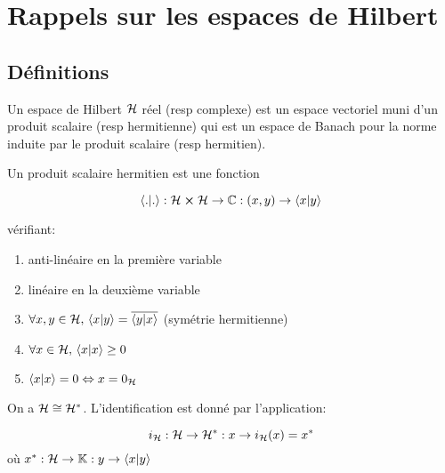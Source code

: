 \section{Rappels sur les espaces de Hilbert}

\subsection{Définitions}

\begin{definition}
	Un espace de Hilbert $\mathcal{H}$ réel (resp complexe) est un espace vectoriel
	muni d'un produit scalaire (resp hermitienne) qui est un espace de Banach
	pour la norme induite par le produit scalaire (resp hermitien).
\end{definition}

\begin{definition}
	Un produit scalaire hermitien est une fonction
	
	\begin{equation}
		\bra{.}\ket{.} : \mathcal{H} \cross
		\mathcal{H} \rightarrow \mathbb{C} :
		(x, y) \rightarrow \bra{x}\ket{y}
	\end{equation}

	vérifiant:

	\begin{enumerate}
		\item anti-linéaire en la première variable
		\item linéaire en la deuxième variable
		\item $\forall x, y \in \mathcal{H}, \, \bra{x}\ket{y} =
			\overline{\bra{y}\ket{x}}$ (symétrie hermitienne)
		\item $\forall x \in \mathcal{H}, \, \bra{x}\ket{x} \geq 0$
		\item $\bra{x}\ket{x} = 0 \Leftrightarrow x = 0_{\mathcal{H}}$
	\end{enumerate}
\end{definition}

\begin{theorem} 
	\label{thm:repr_riesz}
	On a $\mathcal{H} \cong \mathcal{H}^{*}$.
	L'identification est donné par l'application:

	\begin{equation}
		i_{\mathcal{H}} : \mathcal{H} \rightarrow \mathcal{H}^{*} : x \rightarrow
		i_{\mathcal{H}}(x) = x^{*}
	\end{equation}
	où $x^{*} : \mathcal{H} \rightarrow \mathbb{K} : y \rightarrow
	\bra{x}\ket{y}$
\end{theorem}

